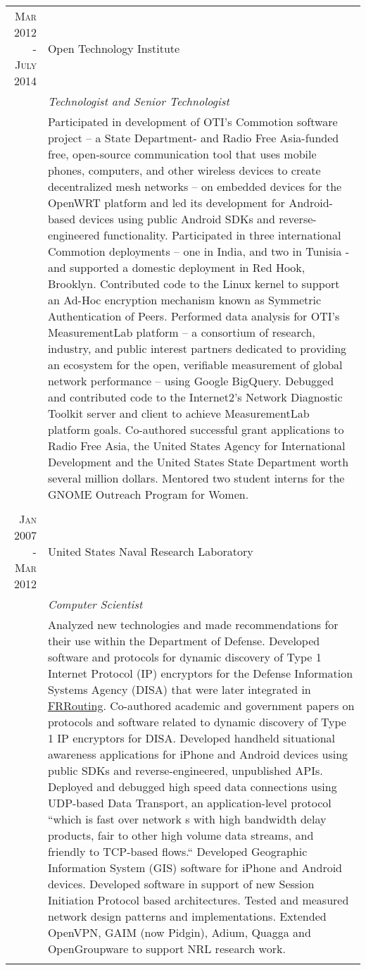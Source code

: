 \documentclass[a4paper,10pt]{article} %
\begin{document}
\begin{tabular}{r|p{11cm}}
\textsc{Mar 2012 - July 2014} & Open Technology Institute \\
& \emph{Technologist and Senior Technologist}\\ 
& \footnotesize{Participated in development of OTI’s Commotion software project – a State Department- and Radio Free Asia-funded free, open-source communication tool that uses mobile phones, computers, and other wireless devices to create decentralized mesh networks – on embedded devices for the OpenWRT platform and led its development for Android-based devices using public Android SDKs and reverse-engineered functionality. Participated in three international Commotion deployments – one in India, and two in Tunisia - and supported a domestic deployment in Red Hook, Brooklyn. Contributed code to the Linux kernel to support an Ad-Hoc encryption mechanism known as Symmetric Authentication of Peers. Performed data analysis for OTI’s MeasurementLab platform – a consortium of research, industry, and public interest partners dedicated to providing an ecosystem for the open, verifiable measurement of global network performance – using Google BigQuery. Debugged and contributed code to the Internet2’s Network Diagnostic Toolkit server and client to achieve MeasurementLab platform goals. Co-authored successful grant applications to Radio Free Asia, the United States Agency for International Development and the United States State Department worth several million dollars. Mentored two student interns for the GNOME Outreach Program for Women.}\\
\multicolumn{2}{c}{	} \\


\textsc{Jan 2007 - Mar 2012} & United States Naval Research Laboratory\\
& \emph{Computer Scientist} \\
& \footnotesize{Analyzed new technologies and made recommendations for their use within the Department of Defense. Developed software and protocols for dynamic discovery of Type 1 Internet Protocol (IP) encryptors for the Defense Information Systems Agency (DISA) that were later integrated in \href{https://frrouting.org/}{FRRouting}. Co-authored academic and government papers on protocols and software related to dynamic discovery of Type 1 IP encryptors for DISA. Developed handheld situational awareness applications for iPhone and Android devices using public SDKs and reverse-engineered, unpublished APIs. Deployed and debugged high speed data connections using UDP-based Data Transport, an application-level protocol ``which is fast over network
s with high bandwidth delay products, fair to other high volume data streams, and friendly to TCP-based flows.`` Developed Geographic Information System (GIS) software for iPhone and Android devices. Developed software in support of new Session Initiation Protocol based architectures. Tested and measured network design patterns and implementations. Extended OpenVPN, GAIM (now Pidgin), Adium, Quagga and OpenGroupware to support NRL research work.}\\
\multicolumn{2}{c}{} \\


\end{tabular}
\end{document}
